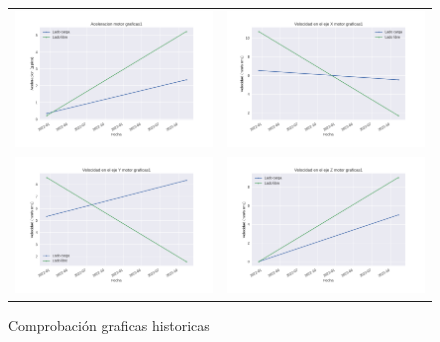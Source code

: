 \documentclass[12pt]{article}
\begin{document}
\begin{refsegment}
    \begin{figure}[H]
        \centering
        \caption{Comprobación graficas historicas}
        \begin{tabular}{m{8cm}m{8cm}}
            \includegraphics[width=8cm]{comprobacion_resultados/finales/as_graficas1.png}&
            \includegraphics[width=8cm]{comprobacion_resultados/finales/vxs_graficas1.png}\\
            \includegraphics[width=8cm]{comprobacion_resultados/finales/vys_graficas1.png}&
            \includegraphics[width=8cm]{comprobacion_resultados/finales/vzs_graficas1.png}\\

\end{tabular}
\end{figure}
\end{refsegment}
\end{document}
